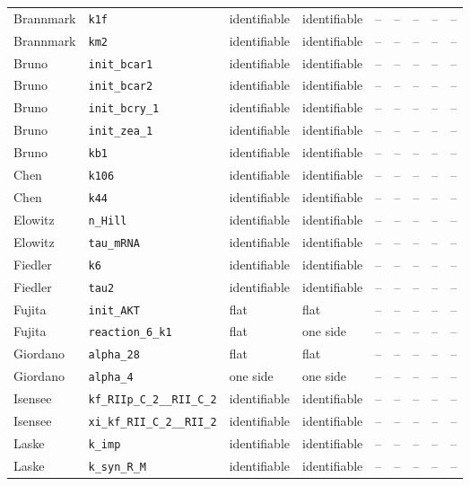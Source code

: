 \begin{longtable}{@{}llllccccc@{}}
Brannmark & \texttt{k1f} & identifiable & identifiable & -- & -- & -- & -- & -- \\
Brannmark & \texttt{km2} & identifiable & identifiable & -- & -- & -- & -- & -- \\
Bruno & \texttt{init\_bcar1} & identifiable & identifiable & -- & -- & -- & -- & -- \\
Bruno & \texttt{init\_bcar2} & identifiable & identifiable & -- & -- & -- & -- & -- \\
Bruno & \texttt{init\_bcry\_1} & identifiable & identifiable & -- & -- & -- & -- & -- \\
Bruno & \texttt{init\_zea\_1} & identifiable & identifiable & -- & -- & -- & -- & -- \\
Bruno & \texttt{kb1} & identifiable & identifiable & -- & -- & -- & -- & -- \\
Chen & \texttt{k106} & identifiable & identifiable & -- & -- & -- & -- & -- \\
Chen & \texttt{k44} & identifiable & identifiable & -- & -- & -- & -- & -- \\
Elowitz & \texttt{n\_Hill} & identifiable & identifiable & -- & -- & -- & -- & -- \\
Elowitz & \texttt{tau\_mRNA} & identifiable & identifiable & -- & -- & -- & -- & -- \\
Fiedler & \texttt{k6} & identifiable & identifiable & -- & -- & -- & -- & -- \\
Fiedler & \texttt{tau2} & identifiable & identifiable & -- & -- & -- & -- & -- \\
Fujita & \texttt{init\_AKT} & flat & flat & -- & -- & -- & -- & -- \\
Fujita & \texttt{reaction\_6\_k1} & flat & one side & -- & -- & -- & -- & -- \\
Giordano & \texttt{alpha\_28} & flat & flat & -- & -- & -- & -- & -- \\
Giordano & \texttt{alpha\_4} & one side & one side & -- & -- & -- & -- & -- \\
Isensee & \texttt{kf\_RIIp\_C\_2\_\_RII\_C\_2} & identifiable & identifiable & -- & -- & -- & -- & -- \\
Isensee & \texttt{xi\_kf\_RII\_C\_2\_\_RII\_2} & identifiable & identifiable & -- & -- & -- & -- & -- \\
Laske & \texttt{k\_imp} & identifiable & identifiable & -- & -- & -- & -- & -- \\
Laske & \texttt{k\_syn\_R\_M} & identifiable & identifiable & -- & -- & -- & -- & -- \\

\end{longtable}
